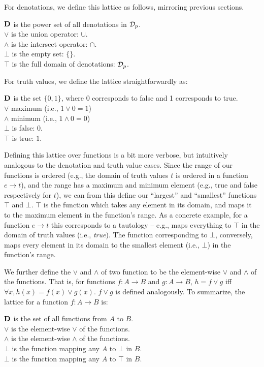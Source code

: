 For denotations, we define this lattice as follows, mirroring previous sections.
\begin{lquote}
$\mathbf{D}$ is the power set of all denotations in $\mathcal{D}_p$. \\
$\lor$ is the union operator: $\cup$. \\
$\land$ is the intersect operator: $\cap$. \\
$\bot$ is the empty set: $\{\}$. \\
$\top$ is the full domain of denotations: $\mathcal{D}_p$.
\end{lquote}

For truth values, we define the lattice straightforwardly as:
\begin{lquote}
$\mathbf{D}$ is the set $\{0, 1\}$, where 0 corresponds to false and 1 corresponds to true. \\
$\lor$ maximum (i.e., $1 \lor 0 = 1$) \\
$\land$ minimum (i.e., $1 \land 0 = 0$) \\
$\bot$ is false: $0$. \\
$\top$ is true: $1$.
\end{lquote}


Defining this lattice over functions is a bit more verbose, but intuitively analogous
  to the denotation and truth value cases.
Since the range of our functions is ordered (e.g., the domain of truth values $t$ is ordered
  in a function $e \rightarrow t$),
  and the range has a maximum and minimum element (e.g., true and false respectively for $t$),
  we can from this define our ``largest'' and ``smallest'' functions $\top$ and $\bot$.
$\top$ is the function which takes any element in its domain, and maps it to
  the maximum element in the function's range.
As a concrete example, for a function $e \rightarrow t$ this corresponds to a tautology --
  e.g.,  maps everything to $\top$ in the domain of truth values
  (i.e., \textit{true}).
The function corresponding to $\bot$, conversely, maps every element in its domain 
  to the smallest element (i.e., $\bot$) in the function's range.

We further define the $\lor$ and $\land$ of two function to be the element-wise $\lor$
  and $\land$ of the functions.
That is, for functions $f:A \rightarrow B$ and $g:A \rightarrow B$, 
  $h = f \lor g$ iff $\forall x, h(x) = f(x) \lor g(x)$.
$f \lor g$ is defined analogously.
To summarize, the lattice for a function $f:A \rightarrow B$ is:

\begin{lquote}
$\mathbf{D}$ is the set of all functions from $A$ to $B$. \\
$\lor$ is the element-wise $\lor$ of the functions. \\
$\land$ is the element-wise $\land$ of the functions. \\
$\bot$ is the function mapping any $A$ to $\bot$ in $B$. \\
$\bot$ is the function mapping any $A$ to $\top$ in $B$. \\
\end{lquote}

